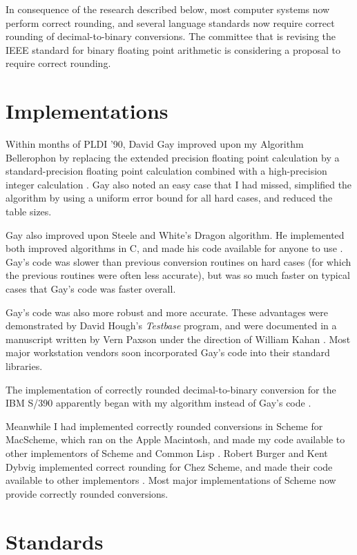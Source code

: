 \documentclass{sigplanconf}
\begin{document}
In consequence of the research described below,
most computer systems now perform correct rounding, and
several language standards now require correct rounding of
decimal-to-binary conversions.  The committee that is revising
the IEEE standard for binary floating point arithmetic is
considering a proposal to require correct rounding.


\section{Implementations}

Within months of PLDI '90, David Gay improved upon my Algorithm
Bellerophon by replacing the extended precision floating point
calculation by a standard-precision floating point calculation
combined with a high-precision integer calculation \cite{Gay:1990}.
Gay also noted an easy case that I had missed, simplified the
algorithm by using a uniform error bound for all hard cases,
and reduced the table sizes.

Gay also improved upon Steele and White's Dragon algorithm.  He
implemented both improved algorithms in C, and made his code
available for anyone to use \cite{Gay:netlib}.  Gay's code was
slower than previous conversion routines on hard cases (for
which the previous routines were often less accurate), but was
so much faster on typical cases that Gay's code was faster
overall.

Gay's code was also more robust and more accurate.  These
advantages were demonstrated by David Hough's \emph{Testbase}
program, and were documented in a manuscript written by Vern
Paxson under the direction of William Kahan
\cite{Hough:testbase,Paxson:1991}.
Most major workstation vendors soon incorporated Gay's code
into their standard libraries.

The implementation of correctly rounded decimal-to-binary
conversion for the IBM S/390 apparently began with my
algorithm instead of Gay's code \cite{Abbott:1999:ASS}.

Meanwhile I had implemented correctly rounded conversions in
Scheme for MacScheme, which ran on the Apple Macintosh, and
made my code available to other implementors of Scheme and
Common Lisp \cite{macscheme}.  Robert Burger and Kent Dybvig
implemented correct rounding for Chez Scheme, and made their
code available to other implementors \cite{Burger:1996:PFN}.
Most major implementations of Scheme now provide correctly
rounded conversions.


\section{Standards}
\end{document}
